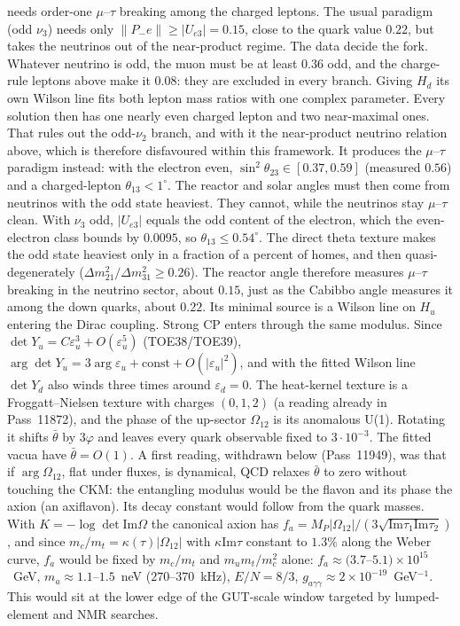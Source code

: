 needs order-one $\mu$--$\tau$ breaking among the charged leptons. The usual paradigm (odd $\nu_3$) needs only $\|P_-e\|\ge|U_{e3}|=0.15$, close to the quark value $0.22$, but takes the neutrinos out of the near-product regime.  The data decide the fork. Whatever neutrino is odd, the muon must be at least $0.36$ odd, and the charge-rule leptons above make it $0.08$: they are excluded in every branch. Giving $H_d$ its own Wilson line fits both lepton mass ratios with one complex parameter. Every solution then has one nearly even charged lepton and two near-maximal ones. That rules out the odd-$\nu_2$ branch, and with it the near-product neutrino relation above, which is therefore disfavoured within this framework. It produces the $\mu$--$\tau$ paradigm instead: with the electron even, $\sin^2\theta_{23}\in[0.37,0.59]$ (measured $0.56$) and a charged-lepton $\theta_{13}<1^\circ$. The reactor and solar angles must then come from neutrinos with the odd state heaviest.  They cannot, while the neutrinos stay $\mu$--$\tau$ clean. With $\nu_3$ odd, $|U_{e3}|$ equals the odd content of the electron, which the even-electron class bounds by $0.0095$, so $\theta_{13}\le0.54^\circ$. The direct theta texture makes the odd state heaviest only in a fraction of a percent of homes, and then quasi-degenerately ($\Delta m^2_{21}/\Delta m^2_{31}\ge0.26$). The reactor angle therefore measures $\mu$--$\tau$ breaking in the neutrino sector, about $0.15$, just as the Cabibbo angle measures it among the down quarks, about $0.22$. Its minimal source is a Wilson line on $H_u$ entering the Dirac coupling.  Strong CP enters through the same modulus. Since $\det Y_u=C\varepsilon_u^3+O(\varepsilon_u^5)$ (TOE38/TOE39), $\arg\det Y_u=3\arg\varepsilon_u+\mathrm{const}+O(|\varepsilon_u|^2)$, and with the fitted Wilson line $\det Y_d$ also winds three times around $\varepsilon_d=0$. The heat-kernel texture is a Froggatt--Nielsen texture with charges $(0,1,2)$ (a reading already in Pass~11872), and the phase of the up-sector $\Omega_{12}$ is its anomalous U(1). Rotating it shifts $\bar\theta$ by $3\varphi$ and leaves every quark observable fixed to $3\cdot10^{-3}$. The fitted vacua have $\bar\theta=O(1)$. A first reading, withdrawn below (Pass~11949), was that if $\arg\Omega_{12}$, flat under fluxes, is dynamical, QCD relaxes $\bar\theta$ to zero without touching the CKM: the entangling modulus would be the flavon and its phase the axion (an axiflavon).  Its decay constant would follow from the quark masses. With $K=-\log\det\mathrm{Im}\Omega$ the canonical axion has $f_a=M_P|\Omega_{12}|/(3\sqrt{\mathrm{Im}\tau_1\mathrm{Im}\tau_2})$, and since $m_c/m_t=\kappa(\tau)|\Omega_{12}|$ with $\kappa\mathrm{Im}\tau$ constant to $1.3\%$ along the Weber curve, $f_a$ would be fixed by $m_c/m_t$ and $m_um_t/m_c^2$ alone: $f_a\approx(3.7$--$5.1)\times10^{15}$~GeV, $m_a\approx1.1$--$1.5$~neV ($270$--$370$~kHz), $E/N=8/3$, $g_{a\gamma\gamma}\approx2\times10^{-19}$~GeV$^{-1}$. This would sit at the lower edge of the GUT-scale window targeted by lumped-element and NMR searches. 